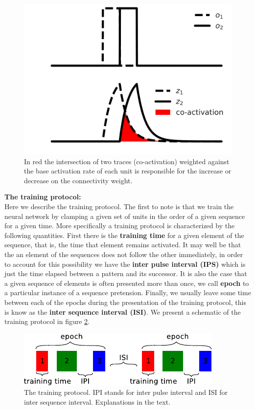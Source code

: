 \documentclass[10pt,a4paper]{article}
\begin{document}
\begin{figure}[H]
\centering
\includegraphics[scale=0.30]{traces_example.pdf}
\caption{In red the intersection of two traces (co-activation) weighted against the base activation rate of each unit is responsible for the increase or decrease on the connectivity weight.}
\label{fig:traces_example}
\end{figure}


\textbf{The training protocol:} \\
Here we describe the training protocol. The first to note is that we train the neural network by clamping a given set of units in the order of a given sequence for a given time. More specifically a training protocol is characterized by the following quantities. First there is the \textbf{training time} for a given element of the sequence, that is, the time that element remains activated. It may well be that the an element of the sequences does not follow the other immediately, in order to account for this possibility we have the \textbf{inter pulse interval (IPS)} which is just the time elapsed between a pattern and its successor. It is also the case that a given sequence of elements is often presented more than once, we call \textbf{epoch} to a particular instance of a sequence pretension. Finally, we usually leave some time between each of the epochs during the presentation of the training protocol, this is know as the \textbf{inter sequence interval (ISI)}. We present a schematic of the training protocol in figure \ref{fig:training_protocol}.

\begin{figure}[H]
\centering
\includegraphics[scale=1.40]{protocol.pdf}
\caption{The training protocol. IPI stands for inter pulse interval and ISI for inter sequence interval. Explanations in the text.}
\label{fig:training_protocol}
\end{figure}
\end{document}
